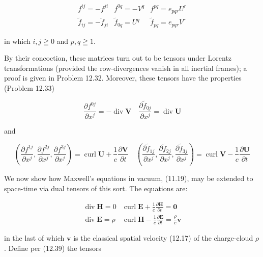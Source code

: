 \documentclass[10pt]{article}
\begin{document}
\[
\begin{array}{lll}
f^{i j}=-f^{j i} & f^{0 q}=-V^{q} & f^{p q}=e_{p q r} U^{r}  \tag{12.39b}\\
\tilde{f}_{i j}=-\tilde{f}_{j i} & \tilde{f}_{0 q}=U^{q} & \tilde{f}_{p q}=e_{p q r} V^{r}
\end{array}
\]

in which $i, j \geqq 0$ and $p, q \geqq 1$.

By their concoction, these matrices turn out to be tensors under Lorentz transformations (provided the row-divergences vanish in all inertial frames); a proof is given in Problem 12.32. Moreover, these tensors have the properties (Problem 12.33)


\begin{equation*}
\frac{\partial f^{0 j}}{\partial x^{j}}=-\operatorname{div} \mathbf{V} \quad \frac{\partial \tilde{f}_{0 j}}{\partial x^{j}}=\operatorname{div} \mathbf{U} \tag{12.40}
\end{equation*}


and


\begin{equation*}
\left(\frac{\partial f^{1 j}}{\partial x^{j}}, \frac{\partial f^{2 j}}{\partial x^{j}}, \frac{\partial f^{3 j}}{\partial x^{j}}\right)=\operatorname{curl} \mathbf{U}+\frac{1}{c} \frac{\partial \mathbf{V}}{\partial t} \quad\left(\frac{\partial \tilde{f}_{1 j}}{\partial x^{j}}, \frac{\partial \tilde{f}_{2 j}}{\partial x^{j}}, \frac{\partial \tilde{f}_{3 j}}{\partial x^{j}}\right)=\operatorname{curl} \mathbf{V}-\frac{1}{c} \frac{\partial \mathbf{U}}{\partial t} \tag{12.41}
\end{equation*}


We now show how Maxwell's equations in vacuum, (11.19), may be extended to space-time via dual tensors of this sort. The equations are:

\[
\begin{array}{ll}
\operatorname{div} \mathbf{H}=0 & \operatorname{curl} \mathbf{E}+\frac{1}{c} \frac{\partial \mathbf{H}}{\partial t}=\mathbf{0} \\
\operatorname{div} \mathbf{E}=\rho & \operatorname{curl} \mathbf{H}-\frac{1}{c} \frac{\partial \mathbf{E}}{\partial t}=\frac{\rho}{c} \mathbf{v} \tag{12.43}
\end{array}
\]

in the last of which $\mathbf{v}$ is the classical spatial velocity (12.17) of the charge-cloud $\rho$. Define per (12.39) the tensors
\end{document}
